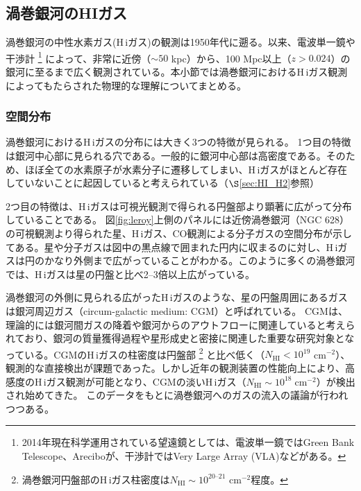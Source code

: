 \subsection{渦巻銀河のHIガス}
\label{sec:spiral}

渦巻銀河の中性水素ガス(H\,{\sc i}ガス)の観測は1950年代に遡る。以来、電波単一鏡や干渉計
\footnote{2014年現在科学運用されている望遠鏡としては、電波単一鏡ではGreen Bank Telescope、Areciboが、干渉計ではVery Large Array (VLA)などがある。}
によって、非常に近傍（$\sim50$ kpc）から、100 Mpc以上（$z>0.024$）の銀河に至るまで広く観測されている。本小節では渦巻銀河におけるH\,{\sc i}ガス観測によってもたらされた物理的な理解についてまとめる。


\subsubsection{空間分布}\label{sec:distribution}
渦巻銀河におけるH\,{\sc i}ガスの分布には大きく3つの特徴が見られる。
1つ目の特徴は銀河中心部に見られる穴である。一般的に銀河中心部は高密度である。そのため、ほぼ全ての水素原子が水素分子に遷移してしまい、H\,{\sc i}ガスがほとんど存在していないことに起因していると考えられている（$\S$\ref{sec:HI_H2}参照）

2つ目の特徴は、H\,{\sc i}ガスは可視光観測で得られる円盤部より顕著に広がって分布していることである\citep[e.g.,][]{1983IAUS..100...55S, 2008AJ....136.2782L}。
図\ref{fig:leroy}上側のパネルには近傍渦巻銀河（NGC 628）の可視観測より得られた星、H\,{\sc i}ガス、CO観測による分子ガスの空間分布が示してある。星や分子ガスは図中の黒点線で囲まれた円内に収まるのに対し、H\,{\sc i}ガスは円のかなり外側まで広がっていることがわかる。このように多くの渦巻銀河では、H\,{\sc i}ガスは星の円盤と比べ2--3倍以上広がっている\citep[e.g.,][]{1983IAUS..100...55S}。

渦巻銀河の外側に見られる広がったH\,{\sc i}ガスのような、星の円盤周囲にあるガスは銀河周辺ガス（circum-galactic medium: CGM）と呼ばれている。
CGMは、理論的には銀河間ガスの降着や銀河からのアウトフローに関連していると考えられており\citep[e.g.,][]{2002ApJ...571...40M, 2006Natur.440..644M, 2009Natur.457..451D, 2009ApJ...703..785D, 2005ApJ...635L..13S, 2011MNRAS.415..11D}、銀河の質量獲得過程や星形成史と密接に関連した重要な研究対象となっている。CGMのH\,{\sc i}ガスの柱密度は円盤部
\footnote{渦巻銀河円盤部のH\,{\sc i}ガス柱密度は$N_\mathrm{HI}\sim10^{20\mbox{--}21}$ cm$^{-2}$程度。}
と比べ低く（$N_\mathrm{HI}<10^{19}$ cm$^{-2}$）、観測的な直接検出が課題であった。しかし近年の観測装置の性能向上により、高感度のH\,{\sc i}ガス観測が可能となり、CGMの淡いH\,{\sc i}ガス（$N_\mathrm{HI}\sim10^{18}\; \mbox{cm}^{-2}$）が検出され始めてきた\citep{2013Natur.497..224W, 2014AJ....147...48P}。
このデータをもとに渦巻銀河へのガスの流入の議論が行われつつある。

